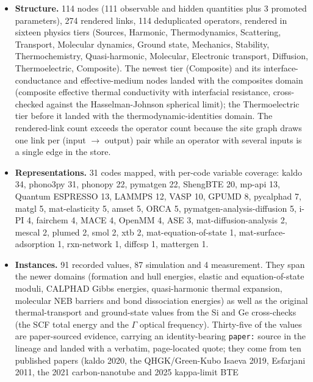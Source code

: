 \documentclass[11pt,a4paper]{article}
\begin{document}
\begin{itemize}[leftmargin=2em, itemsep=0.25em]
  \item \textbf{Structure.} 114 nodes (111 observable and hidden quantities plus 3
        promoted parameters), 274 rendered links, 114 deduplicated operators,
        rendered in sixteen physics tiers (Sources, Harmonic, Thermodynamics,
        Scattering, Transport, Molecular dynamics, Ground state, Mechanics,
        Stability, Thermochemistry, Quasi-harmonic, Molecular, Electronic
        transport, Diffusion, Thermoelectric, Composite). The newest tier
        (Composite) and its interface-conductance and effective-medium nodes
        landed with the composites domain (composite effective thermal
        conductivity with interfacial resistance, cross-checked against the
        Hasselman-Johnson spherical limit); the Thermoelectric tier before it
        landed with the thermodynamic-identities domain. The
        rendered-link count exceeds the operator count because the site graph
        draws one link per (input $\to$ output) pair while an operator with
        several inputs is a single edge in the store.
  \item \textbf{Representations.} 31 codes mapped, with per-code variable coverage:
        kaldo 34, phono3py 31, phonopy 22, pymatgen 22, ShengBTE 20, mp-api 13,
        Quantum ESPRESSO 13, LAMMPS 12, VASP 10, GPUMD 8, pycalphad 7, matgl 5,
        mat-elasticity 5, amset 5, ORCA 5, pymatgen-analysis-diffusion 5,
        i-PI 4, fairchem 4, MACE 4, OpenMM 4, ASE 3,
        mat-diffusion-analysis 2, mescal 2, plumed 2, smol 2, xtb 2,
        mat-equation-of-state 1, mat-surface-adsorption 1, rxn-network 1,
        diffcsp 1, mattergen 1.
  \item \textbf{Instances.} 91 recorded values, 87 simulation and 4 measurement.
        They span the newer domains (formation and hull energies, elastic and
        equation-of-state moduli, CALPHAD Gibbs energies, quasi-harmonic thermal
        expansion, molecular NEB barriers and bond dissociation energies) as
        well as the original thermal-transport and ground-state values from the
        Si and Ge cross-checks (the SCF total energy and the $\Gamma$ optical
        frequency). Thirty-five of the values are paper-sourced evidence,
        carrying an identity-bearing \texttt{paper:} source in the lineage and
        landed with a verbatim, page-located quote; they come from ten
        published papers (kaldo 2020, the QHGK/Green-Kubo Isaeva 2019,
        Esfarjani 2011, the 2021 carbon-nanotube and 2025 kappa-limit BTE

\end{itemize}
\end{document}
